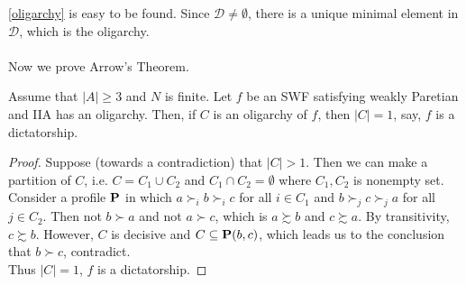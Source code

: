 \cref{oligarchy} is easy to be found. Since $\mathcal{D} \neq \emptyset$, there is a unique minimal element in $\mathcal{D}$, which is the oligarchy. \\
~\\
Now we prove Arrow's Theorem.

\begin{lemma}
    Assume that $|A| \geq 3$ and $N$ is finite. Let $f$ be an SWF satisfying weakly Paretian and IIA has an oligarchy. Then, if $C$ is an oligarchy of $f$, then $|C| = 1$, say, $f$ is a dictatorship. 
\end{lemma}

\begin{proof}
    Suppose (towards a contradiction) that $|C| > 1$. Then we can make a partition of $C$, i.e. $C = C_1 \cup C_2$ and $C_1 \cap C_2 = \emptyset$ where $C_1,C_2$ is nonempty set.\\
    Consider a profile $\mathbf{P}$ in which $a \succ_i b \succ_i c$ for all $i \in C_1$ and $b \succ_j c \succ_j a$ for all $j \in C_2$. Then not $b \succ a$ and not $a \succ c$, which is $a \succsim b$ and $c \succsim a$. By transitivity, $c \succsim b$. However, $C$ is decisive and $C \subseteq \mathbf{P}(b,c)$, which leads us to the conclusion that $b \succ c$, contradict.\\
    Thus $|C| = 1$, $f$ is a dictatorship.
\end{proof}